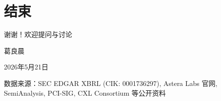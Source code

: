 \documentclass[aspectratio=169, 10pt, UTF8]{ctexbeamer}
\begin{document}
\section*{结束}

\begin{frame}[plain]
  \centering
  \vfill
  {\huge\color{ieeeBlue} 谢谢！欢迎提问与讨论}

  \vspace{20pt}
  {\large 葛良晨}

  \vspace{8pt}
  {\normalsize 2026年5月21日}

  \vspace{20pt}
  {\small\color{darkGray} 数据来源：SEC EDGAR XBRL (CIK: 0001736297), Astera Labs 官网,\\
    SemiAnalysis, PCI-SIG, CXL Consortium 等公开资料}
  \vfill
\end{frame}
\end{document}
